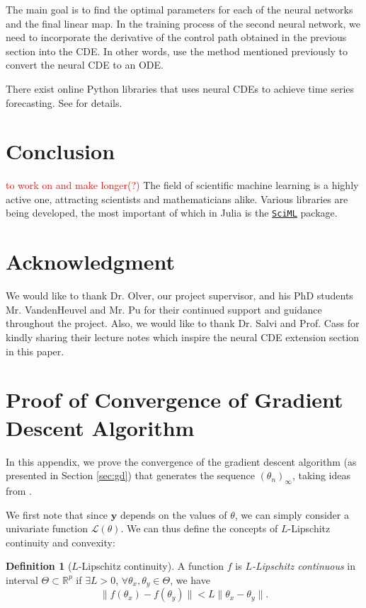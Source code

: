 \documentclass[a4paper,11pt,titlepage]{article}
\theoremstyle{definition}
\newtheorem{definition}{Definition}[section]
\theoremstyle{plain}
\theoremstyle{remark}
\begin{document}
The main goal is to find the optimal parameters for each of the neural networks and the final linear map. In the training process of the second neural network, we need to incorporate the derivative of the control path obtained in the previous section into the CDE. In other words, use the method mentioned previously to convert the neural CDE to an ODE.

There exist online Python libraries that uses neural CDEs to achieve time series forecasting. See \cite{Jhin2023} for details.

\pagebreak
\section{Conclusion}

\textcolor{red}{to work on and make longer(?)}
The field of scientific machine learning is a highly active one, attracting scientists and mathematicians alike. Various libraries are being developed, the most important of which in Julia is the \href{https://sciml.ai/}{\texttt{SciML}} package.

\section*{Acknowledgment}

We would like to thank Dr. Olver, our project supervisor, and his PhD students Mr. VandenHeuvel and Mr. Pu for their continued support and guidance throughout the project. Also, we would like to thank Dr. Salvi and Prof. Cass for kindly sharing their lecture notes which inspire the neural CDE extension section in this paper.

\pagebreak
\appendix
\section{Proof of Convergence of Gradient Descent Algorithm}
\label{sec:gdproof}

In this appendix, we prove the convergence of the gradient descent algorithm (as presented in Section \ref{sec:gd}) that generates the sequence $(\theta_n)_\infty$, taking ideas from \cite{gower2015}.

We first note that since $\mathbf{\hat{y}}$ depends on the values of $\theta$, we can simply consider a univariate function $\mathcal{L}(\theta)$. We can thus define the concepts of $L$-Lipschitz continuity and convexity:

\begin{definition}[$L$-Lipschitz continuity]
    A function $f$ is $L$\textit{-Lipschitz continuous} in interval $\Theta \subset \mathbb{R}^p$ if $\exists L > 0$, $\forall \theta_x, \theta_y \in \Theta$, we have
    $$
    \|f(\theta_x) - f(\theta_y)\| < L \| \theta_x - \theta_y\|.
    $$
\end{definition}
\end{document}
